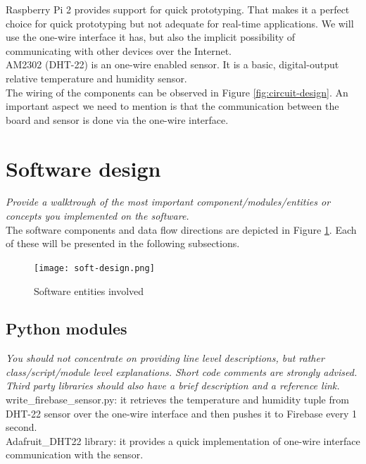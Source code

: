 \documentclass[a4paper,11pt]{article}
\begin{document}
Raspberry Pi 2 provides support for quick prototyping. That makes it a perfect choice for quick prototyping but not adequate for real-time applications. We will use the one-wire interface it has, but also the implicit possibility of communicating with other devices over the Internet. \\

AM2302 (DHT-22) is an one-wire enabled sensor. It is a basic, digital-output relative temperature and humidity sensor.\\

The wiring of the components can be observed in Figure \ref{fig:circuit-design}. An important aspect we need to mention is that the communication between the board and sensor is done via the one-wire interface.


\section{Software design}
\textit{Provide a walktrough of the most important component/modules/entities or concepts you implemented on the software.}\\

The software components and data flow directions are depicted in Figure \ref{fig:soft-design}. Each of these will be presented in the following subsections.\\

\begin{figure}[h]
\centering
\texttt{[image: soft-design.png]}
\caption{Software entities involved}
\label{fig:soft-design}
\end{figure}
 
\subsection{Python modules}
\textit{You should not concentrate on providing line level descriptions, but rather class/script/module level explanations. Short code comments are strongly advised. Third party libraries should also have a brief description and a reference link.}\\

write\_firebase\_sensor.py: it retrieves the temperature and humidity tuple from DHT-22 sensor over the one-wire interface and then pushes it to Firebase every 1 second. \\

Adafruit\_DHT22 library: it provides a quick implementation of one-wire interface communication with the sensor.
\end{document}
